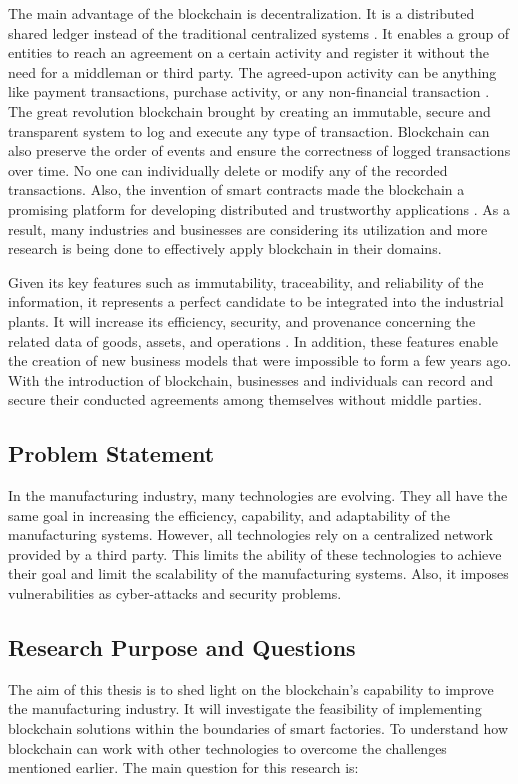 \documentclass[runningheads]{llncs}
\begin{document}
\noindent The main  advantage of the blockchain is decentralization. It is a distributed shared ledger instead of the traditional centralized systems \cite{Zheng2017}. It enables a group of entities to reach an agreement on a certain activity and register it without the need for a middleman or third party. The agreed-upon activity can be anything like payment transactions, purchase activity, or any non-financial transaction \cite{Mohamed}. The great revolution blockchain brought by creating an immutable, secure and transparent system to log and execute any type of transaction. Blockchain can also preserve the order of events and ensure the correctness of logged transactions over time. No one can individually delete or modify any of the recorded transactions. Also, the invention of smart contracts made the blockchain a promising platform for developing distributed and trustworthy applications \cite{Mohamed}. As a result, many industries and businesses are considering its utilization and more research is being done to effectively apply blockchain in their domains.

\bigbreak

\noindent Given its key features such as immutability, traceability, and reliability of the information, it represents a perfect candidate to be integrated into the industrial plants. It will increase its efficiency, security, and provenance concerning the related data of goods, assets, and operations \cite{Internet2019}. In addition, these features enable the creation of new business models that were impossible to form a few years ago. With the introduction of blockchain, businesses and individuals can record and secure their conducted agreements among themselves without middle parties.


\subsection{Problem Statement}
In the manufacturing industry, many technologies are evolving. They all have the same goal in increasing the efficiency, capability, and adaptability of the manufacturing systems. However, all technologies rely on a centralized network provided by a third party. This limits the ability of these technologies to achieve their goal and limit the scalability of the manufacturing systems. Also, it imposes vulnerabilities as cyber-attacks and security problems.


\subsection{Research Purpose and Questions}
The aim of this thesis is to shed light on the blockchain’s capability to improve the manufacturing industry. It will investigate the feasibility of implementing blockchain solutions within the boundaries of smart factories. To understand how blockchain can work with other technologies to overcome the challenges mentioned earlier. The main question for this research is:
\end{document}
